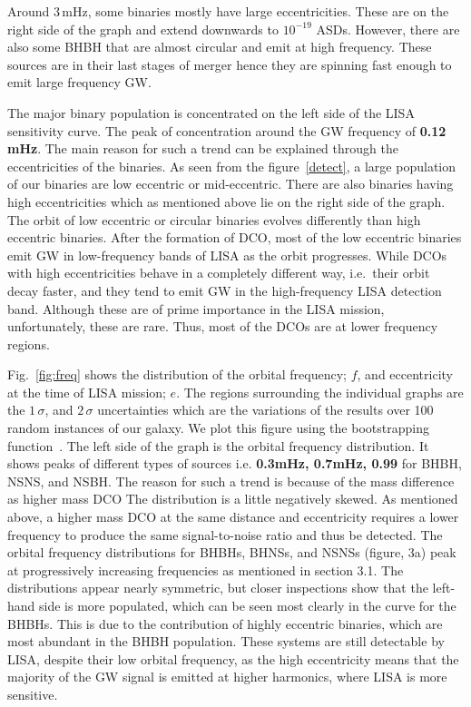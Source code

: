 \documentclass[journal, twocolumn]{IEEEtran}
\begin{document}
    Around $3\,\text{mHz}$, some binaries mostly have large eccentricities.
    These are on the right side of the graph and extend downwards to $10^{-19}$ ASDs. However, there are also some BHBH that are almost circular and emit at high frequency.
    These sources are in their last stages of merger hence they are spinning fast enough to emit large frequency GW\@.

    The major binary population is concentrated on the left side of the LISA sensitivity curve.
    The peak of concentration around the GW frequency of \textbf{0.12 mHz}.
    The main reason for such a trend can be explained through the eccentricities of the binaries.
    As seen from the figure~\ref{detect}, a large population of our binaries are low eccentric or mid-eccentric.
    There are also binaries having high eccentricities which as mentioned above lie on the right side of the graph.
    The orbit of low eccentric or circular binaries evolves differently than high eccentric binaries.
    After the formation of DCO, most of the low eccentric binaries emit GW in low-frequency bands of LISA as the orbit progresses.
    While DCOs with high eccentricities behave in a completely different way, i.e.\ their orbit decay faster, and they tend to emit GW in the high-frequency LISA detection band.
    Although these are of prime importance in the LISA mission, unfortunately, these are rare.
    Thus, most of the DCOs are at lower frequency regions.

    Fig.~\ref{fig:freq} shows the distribution of the orbital frequency; $f$, and eccentricity at the time of LISA mission; $e$.
    The regions surrounding the individual graphs are the $1\,\sigma$, and $2\,\sigma$ uncertainties which are the variations of the results over 100 random instances of our galaxy.
    We plot this figure using the bootstrapping function~\cite{wagg2021gravitational}.
    The left side of the graph is the orbital frequency distribution.
    It shows peaks of different types of sources i.e. \textbf{0.3mHz, 0.7mHz, 0.99} for BHBH, NSNS, and NSBH\@.
    The reason for such a trend is because of the mass difference as higher mass DCO The distribution is a little negatively skewed.
    As mentioned above, a higher mass DCO at the same distance and eccentricity requires a lower frequency to produce the same signal-to-noise ratio and thus be detected.
    The orbital frequency distributions for BHBHs, BHNSs, and NSNSs (figure, 3a) peak at progressively increasing
    frequencies as mentioned in section 3.1.
    The distributions appear nearly symmetric, but closer inspections show that the left-hand side is more populated, which can be seen most clearly in the curve for the BHBHs.
    This is due to the contribution of highly eccentric binaries, which are most abundant in the BHBH population.
    These systems are still detectable by LISA, despite their low orbital frequency, as the high eccentricity means that the majority of the GW signal is emitted at higher harmonics, where LISA is more sensitive.
\end{document}
